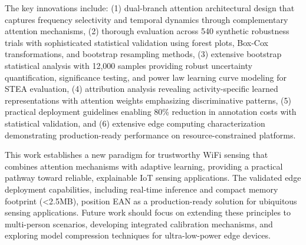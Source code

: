 \documentclass[lettersize,journal]{IEEEtran}
\begin{document}
The key innovations include: (1) dual-branch attention architectural design that captures frequency selectivity and temporal dynamics through complementary attention mechanisms, (2) thorough evaluation across 540 synthetic robustness trials with sophisticated statistical validation using forest plots, Box-Cox transformations, and bootstrap resampling methods, (3) extensive bootstrap statistical analysis with 12,000 samples providing robust uncertainty quantification, significance testing, and power law learning curve modeling for STEA evaluation, (4) attribution analysis revealing activity-specific learned representations with attention weights emphasizing discriminative patterns, (5) practical deployment guidelines enabling 80\% reduction in annotation costs with statistical validation, and (6) extensive edge computing characterization demonstrating production-ready performance on resource-constrained platforms.

This work establishes a new paradigm for trustworthy WiFi sensing that combines attention mechanisms with adaptive learning, providing a practical pathway toward reliable, explainable IoT sensing applications. The validated edge deployment capabilities, including real-time inference and compact memory footprint (<2.5MB), position EAN as a production-ready solution for ubiquitous sensing applications. Future work should focus on extending these principles to multi-person scenarios, developing integrated calibration mechanisms, and exploring model compression techniques for ultra-low-power edge devices.
\end{document}
